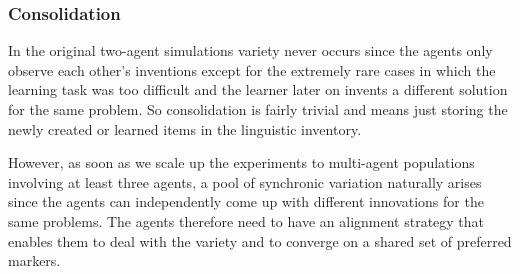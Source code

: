 \subsubsection{Consolidation}
 In the original two-agent simulations variety never occurs since the agents only observe each other's inventions except for the extremely rare cases in which the learning task was too difficult and the learner later on invents a different solution for the same problem. So consolidation is fairly trivial and means just storing the newly created or learned items in the linguistic inventory.

However, as soon as we scale up the experiments to multi-agent populations involving at least three agents, a pool of synchronic variation naturally arises since the agents can independently come up with different innovations for the same problems. The agents therefore need to have an alignment strategy that enables them to deal with the variety and to converge on a shared set of preferred markers.

